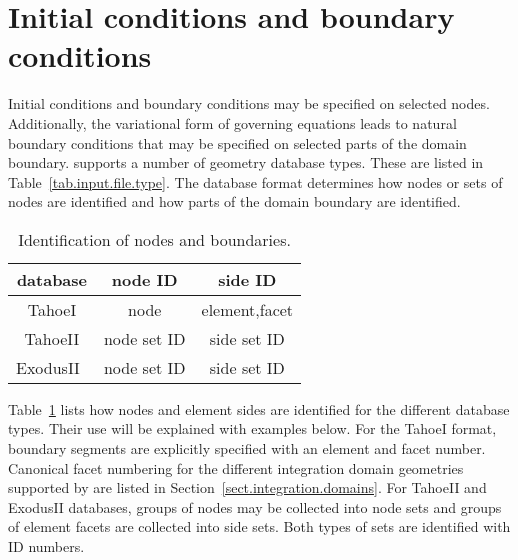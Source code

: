 
\section{Initial conditions and boundary conditions}
\label{set.ICandBC}
Initial conditions and boundary conditions may be specified on 
selected nodes. Additionally, the variational form 
of governing equations leads to natural boundary conditions that may 
be specified on selected parts of the domain boundary. \tahoe 
supports a number of geometry database types. These are listed in 
Table~\ref{tab.input.file.type}. The database format determines how 
nodes or sets of nodes are identified and how parts of the domain 
boundary are identified.
\begin{table}[h]
\begin{center}
\caption{\label{tab.BC.type} Identification of nodes and 
boundaries.}
\begin{tabular}[c]{|c|c|c|}
\hline
 \parbox[b]{1.25in}{\centering \textbf{database}}
&\parbox[b]{1.5in}{\centering \textbf{node ID}}
&\parbox[b]{1.5in}{\centering \textbf{side ID}}\\
\hline
  \parbox[b]{1.25in}{\centering TahoeI}
& \parbox[b]{1.5in}{\centering node}
& \parbox[b]{1.5in}{\centering element,facet} \\
\hline
  \parbox[b]{1.25in}{\centering TahoeII}
& \parbox[b]{1.5in}{\centering node set ID}
& \parbox[b]{1.5in}{\centering side set ID} \\
\hline
  \parbox[b]{1.25in}{\centering \textsf{ExodusII}~\cite{ExodusII}}
& \parbox[b]{1.5in}{\centering node set ID}
& \parbox[b]{1.5in}{\centering side set ID} \\
\hline
\end{tabular}
\end{center}
\end{table}
Table~\ref{tab.BC.type} lists how nodes and element sides are 
identified for the different database types. Their use will be 
explained with examples below. For the TahoeI format, boundary 
segments are explicitly specified with an element and facet number. 
Canonical facet numbering for the different integration domain 
geometries supported by \tahoe are listed in 
Section~\ref{sect.integration.domains}. For TahoeII and 
\textsf{ExodusII} databases, groups of nodes may be collected into 
node sets and groups of element facets are collected into side sets. 
Both types of sets are identified with ID numbers.

